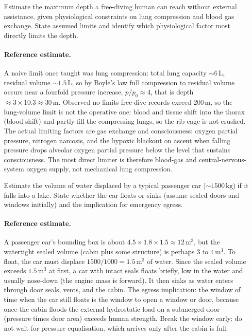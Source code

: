 \begin{exercise}
Estimate the maximum depth a free-diving human can reach without
external assistance, given physiological constraints on lung
compression and blood gas exchange. State assumed limits and
identify which physiological factor most directly limits the
depth.

\paragraph{Reference estimate.} A naive limit once taught was lung
compression: total lung capacity $\sim 6\,\text{L}$, residual volume
$\sim 1.5\,\text{L}$, so by Boyle's law full compression to residual
volume occurs near a fourfold pressure increase, $p/p_0 \approx 4$, that
is depth $\approx 3 \times 10.3 \approx 30\,\si{\meter}$. Observed
no-limits free-dive records exceed $200\,\si{\meter}$, so the lung-volume
limit is not the operative one: blood and tissue shift into the thorax
(blood shift) and partly fill the compressing lungs, so the rib cage is
not crushed. The actual limiting factors are gas exchange and
consciousness: oxygen partial pressure, nitrogen narcosis, and the
hypoxic blackout on ascent when falling pressure drops alveolar oxygen
partial pressure below the level that sustains consciousness. The
most direct limiter is therefore blood-gas and central-nervous-system
oxygen supply, not mechanical lung compression.
\end{exercise}

\begin{exercise}
Estimate the volume of water displaced by a typical passenger car
($\sim 1500\,\si{\kilogram}$) if it falls into a lake. State
whether the car floats or sinks (assume sealed doors and windows
initially) and the implication for emergency egress.

\paragraph{Reference estimate.} A passenger car's bounding box is about
$4.5 \times 1.8 \times 1.5 \approx 12\,\text{m}^3$, but the watertight
sealed volume (cabin plus some structure) is perhaps $3\text{ to }4\,
\text{m}^3$. To float, the car must displace $1500/1000 = 1.5\,\text{m}^3$
of water. Since the sealed volume exceeds $1.5\,\text{m}^3$ at first, a
car with intact seals floats briefly, low in the water and usually
nose-down (the engine mass is forward). It then sinks as water enters
through door seals, vents, and the cabin. The egress implication: the
window of time when the car still floats is the window to open a window
or door, because once the cabin floods the external hydrostatic load on
a submerged door (pressure times door area) exceeds human strength.
Break the window early; do not wait for pressure equalisation, which
arrives only after the cabin is full.
\end{exercise}

